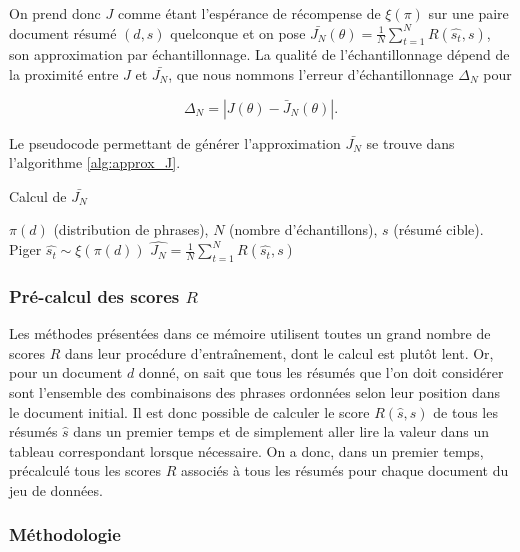 On prend donc $J$ comme étant l'espérance de récompense de $\xi(\pi)$ sur une paire 
document résumé $(d, s)$ quelconque et on pose
 $\bar{J_N}(\theta) =  \frac{1}{N} \sum_{t=1}^N R(\hat{s_t}, s)$, son approximation par échantillonnage.
La qualité de l'échantillonnage dépend de la proximité entre $J$ et $\bar{J_N}$, que
nous nommons l'erreur d'échantillonnage $\Delta_N$ pour

\begin{equation}
    \Delta_N = \left| J(\theta) - \bar{J}_N(\theta) \right|.
\end{equation}

Le pseudocode permettant de générer l'approximation $\bar{J_N}$ se trouve 
dans l'algorithme \ref{alg:approx_J}.

\begin{algorithm}[!h]
    \caption{Calcul de $\bar{J_N}$}
    \begin{algorithmic}[1]
        \Require $\pi(d)$ (distribution de phrases), $N$ (nombre d'échantillons), $s$ (résumé cible).
        \State Piger $\hat{s_t}\sim \xi\left(\pi(d)\right)$
        \EndFor
        \State $\hat{J_N} = \frac{1}{N} \sum_{t=1}^N R(\hat{s_t}, s)$
    \end{algorithmic}
    \label{alg:approx_J}
\end{algorithm}

\subsubsection*{Pré-calcul des scores $R$}

Les méthodes présentées dans ce mémoire utilisent toutes
un grand nombre de scores $R$ dans leur procédure d'entraînement, dont le calcul
est plutôt lent.
Or, pour un document $d$ donné, on sait que tous les résumés que l'on doit considérer sont 
l'ensemble des combinaisons des phrases ordonnées selon leur position dans 
le document initial.
Il est donc possible de calculer le score $R(\hat{s}, s)$ de tous les résumés $\hat{s}$
dans un premier temps et de simplement aller lire la valeur dans 
un tableau correspondant lorsque nécessaire.
On a donc, dans un premier temps, précalculé tous les scores $R$
associés à tous les résumés pour chaque document du jeu de données.

\subsubsection*{Méthodologie}

